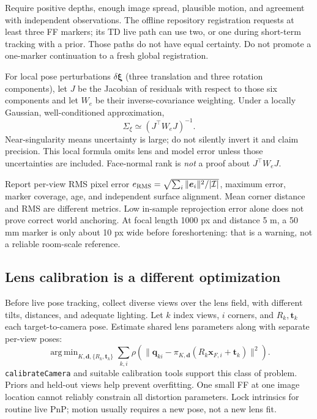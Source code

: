\documentclass[11pt,a4paper]{article}
\newcommand{\pt}[1]{\bm{x}_{#1}}
\DeclareMathOperator*{\argmin}{arg\,min}
\begin{document}
Require positive depths, enough image spread, plausible motion, and agreement
with independent observations. The offline repository registration requests
at least three FF markers; its TD live path can use two, or one during
short-term tracking with a prior. Those paths do not have equal certainty.
Do not promote a one-marker continuation to a fresh global registration.

For local pose perturbations $\delta\bm{\xi}$ (three translation and three
rotation components), let $J$ be the Jacobian of residuals with respect to
those six components and let $W_e$ be their inverse-covariance weighting.
Under a locally Gaussian, well-conditioned approximation,
\begin{equation}
\Sigma_{\xi}\simeq(J^\top W_eJ)^{-1}.
\label{eq:posecov}
\end{equation}
Near-singularity means uncertainty is large; do not silently invert it and
claim precision. This local formula omits lens and model error unless those
uncertainties are included. Face-normal rank is \emph{not} a proof about
$J^\top W_eJ$.

Report per-view RMS pixel error
$e_{\rm RMS}=\sqrt{\sum_i\|\bm{e}_i\|^2/|\mathcal I|}$,
maximum error, marker coverage, age, and independent surface alignment.
Mean corner distance and RMS are different metrics. Low in-sample
reprojection error alone does not prove correct world anchoring.
At focal length 1000 px and distance 5 m, a 50 mm marker is only about
10 px wide before foreshortening: that is a warning, not a reliable
room-scale reference.

\subsection{Lens calibration is a different optimization}
Before live pose tracking, collect diverse views over the lens field,
with different tilts, distances, and adequate lighting. Let $k$ index
views, $i$ corners, and $R_k,\bm{t}_k$ each target-to-camera pose.
Estimate shared lens parameters along with separate per-view poses:
\begin{equation}
\argmin_{K,\bm{d},\{R_k,\bm{t}_k\}}
\sum_{k,i}\rho\!\left(
\|\bm{q}_{ki}-\pi_{K,\bm{d}}(R_k\pt{F,i}+\bm{t}_k)\|^2
\right).
\label{eq:lensfit}
\end{equation}
\texttt{calibrateCamera} and suitable calibration tools support this class
of problem. Priors and held-out views help prevent overfitting.
One small FF at one image location cannot reliably constrain all distortion
parameters. Lock intrinsics for routine live PnP; motion usually requires a
new pose, not a new lens fit.
\end{document}
